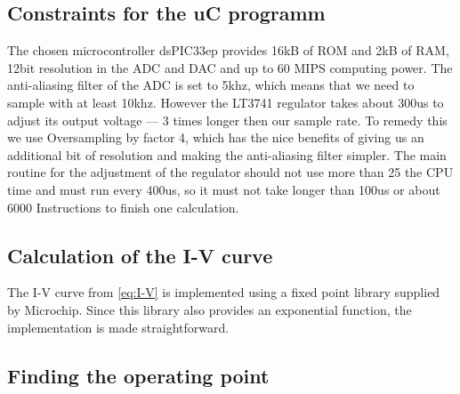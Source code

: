 

\subsection{Constraints for the uC programm}

The chosen microcontroller dsPIC33ep provides 16kB  of ROM and 2kB of RAM, 12bit
resolution  in  the  ADC  and  DAC  and  up  to  60  MIPS  computing  power. The
anti-aliasing filter of the ADC is set to 5khz, which  means  that  we  need  to
sample with at least 10khz. However the LT3741 regulator  takes  about  300us to
adjust  its  output  voltage  --- 3 times longer then our sample rate. To remedy
this  we use Oversampling by factor 4, which has the nice benefits of giving  us
an additional bit of resolution and making the anti-aliasing filter simpler. The
main routine for the adjustment of the regulator should not use more than 25%
the CPU  time and must run every 400us, so it must not take longer than 100us or
about 6000 Instructions to finish one calculation.


\subsection{Calculation of the I-V curve}

The  I-V  curve  from  \eqref{eq:I-V} is implemented using a fixed point  library
supplied by Microchip. Since this library also provides an exponential function,
the implementation is made straightforward.


\subsection{Finding the operating point}
\label{subsec:finding-the-operating-point}

